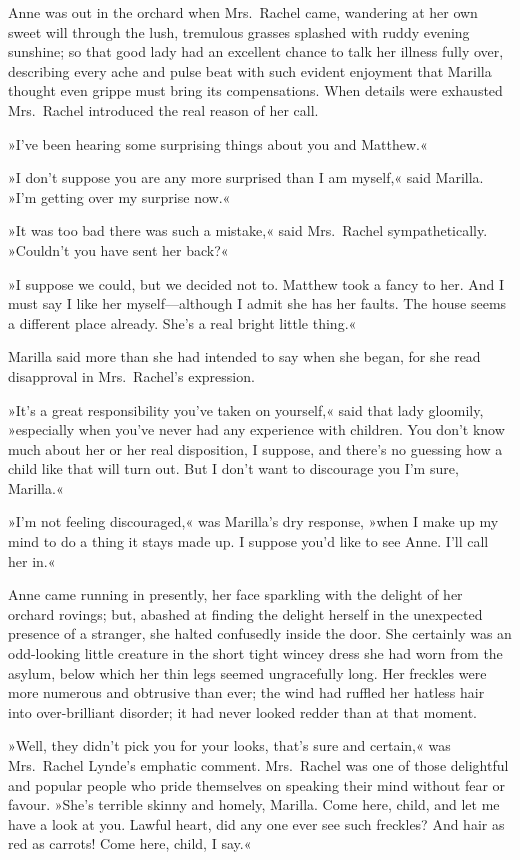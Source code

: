Anne was out in the orchard when Mrs.~Rachel came, wandering at her own sweet will through the lush, tremulous grasses splashed with ruddy evening sunshine; so that good lady had an excellent chance to talk her illness fully over, describing every ache and pulse beat with such evident enjoyment that Marilla thought even grippe must bring its compensations. When details were exhausted Mrs.~Rachel introduced the real reason of her call.

»I've been hearing some surprising things about you and Matthew.«

»I don't suppose you are any more surprised than I am myself,« said Marilla. »I'm getting over my surprise now.«

»It was too bad there was such a mistake,« said Mrs.~Rachel sympathetically. »Couldn't you have sent her back?«

»I suppose we could, but we decided not to. Matthew took a fancy to her. And I must say I like her myself—although I admit she has her faults. The house seems a different place already. She's a real bright little thing.«

Marilla said more than she had intended to say when she began, for she read disapproval in Mrs.~Rachel's expression.

»It's a great responsibility you've taken on yourself,« said that lady gloomily, »especially when you've never had any experience with children. You don't know much about her or her real disposition, I suppose, and there's no guessing how a child like that will turn out. But I don't want to discourage you I'm sure, Marilla.«

»I'm not feeling discouraged,« was Marilla's dry response, »when I make up my mind to do a thing it stays made up. I suppose you'd like to see Anne. I'll call her in.«

Anne came running in presently, her face sparkling with the delight of her orchard rovings; but, abashed at finding the delight herself in the unexpected presence of a stranger, she halted confusedly inside the door. She certainly was an odd-looking little creature in the short tight wincey dress she had worn from the asylum, below which her thin legs seemed ungracefully long. Her freckles were more numerous and obtrusive than ever; the wind had ruffled her hatless hair into over-brilliant disorder; it had never looked redder than at that moment.

»Well, they didn't pick you for your looks, that's sure and certain,« was Mrs.~Rachel Lynde's emphatic comment. Mrs.~Rachel was one of those delightful and popular people who pride themselves on speaking their mind without fear or favour. »She's terrible skinny and homely, Marilla. Come here, child, and let me have a look at you. Lawful heart, did any one ever see such freckles? And hair as red as carrots! Come here, child, I say.«

